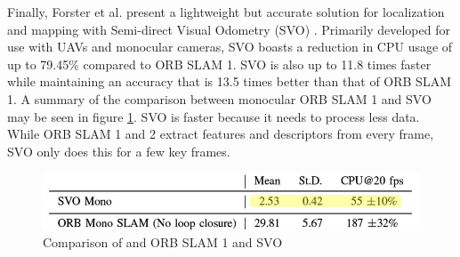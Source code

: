 \documentclass[english]{upeeei}
\begin{document}
\newline
Finally, Forster et al. present a lightweight but accurate solution for
localization and mapping with Semi-direct Visual Odometry (SVO) \cite{SVO2017}. Primarily developed for use with
UAVs and monocular cameras, SVO boasts a reduction in CPU usage of up to 79.45\% compared to ORB SLAM 1. 
SVO is also up to 11.8 times faster while maintaining an accuracy that is 13.5 times better than that of ORB SLAM 1. 
A summary of the comparison between monocular ORB SLAM 1 and SVO may be seen in figure \ref{fig:SVO_VS_ORB}. SVO is faster
because it needs to process less data. While ORB SLAM 1 and 2 extract features and descriptors from every frame, SVO only
does this for a few key frames. 
\begin{figure}[h]
    \centering
    \includegraphics[scale=0.5]{images/SVO_CPU_time.jpg}
    \caption{Comparison of and ORB SLAM 1 and SVO\cite{SVO2017}}
    \label{fig:SVO_VS_ORB}
\end{figure}
\end{document}
